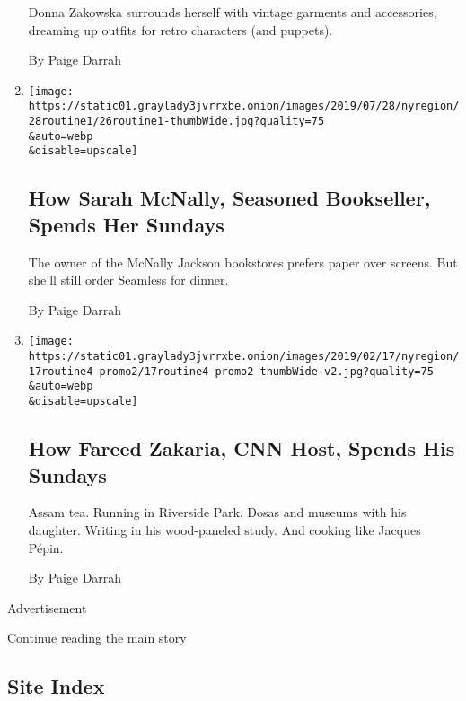 \begin{enumerate}
  Donna Zakowska surrounds herself with vintage garments and
  accessories, dreaming up outfits for retro characters (and puppets).

  By Paige Darrah
\item
  \href{/2019/07/26/nyregion/sarah-mcnally-jackson-books.html}{}

  \texttt{[image: https://static01.graylady3jvrrxbe.onion/images/2019/07/28/nyregion/28routine1/26routine1-thumbWide.jpg?quality=75\\\&auto=webp\\\&disable=upscale]}

  \hypertarget{how-sarah-mcnally-seasoned-bookseller-spends-her-sundays}{%
  \subsection{How Sarah McNally, Seasoned Bookseller, Spends Her
  Sundays}\label{how-sarah-mcnally-seasoned-bookseller-spends-her-sundays}}

  The owner of the McNally Jackson bookstores prefers paper over
  screens. But she'll still order Seamless for dinner.

  By Paige Darrah
\item
  \href{/2019/02/15/nyregion/how-fareed-zakaria-cnn-host-spends-his-sundays.html}{}

  \texttt{[image: https://static01.graylady3jvrrxbe.onion/images/2019/02/17/nyregion/17routine4-promo2/17routine4-promo2-thumbWide-v2.jpg?quality=75\\\&auto=webp\\\&disable=upscale]}

  \hypertarget{how-fareed-zakaria-cnn-host-spends-his-sundays}{%
  \subsection{How Fareed Zakaria, CNN Host, Spends His
  Sundays}\label{how-fareed-zakaria-cnn-host-spends-his-sundays}}

  Assam tea. Running in Riverside Park. Dosas and museums with his
  daughter. Writing in his wood-paneled study. And cooking like Jacques
  Pépin.

  By Paige Darrah
\end{enumerate}

Advertisement

\protect\hyperlink{after-mid2}{Continue reading the main story}

\hypertarget{site-index}{%
\subsection{Site Index}\label{site-index}}

